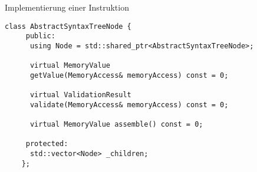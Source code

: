 
\begin{frame}[fragile]{Implementierung einer Instruktion}
  \pause
  \begin{lstlisting}[style=C++,emph={getValue, validate, assemble},emphstyle=\underline]
    class AbstractSyntaxTreeNode {
     public:
      using Node = std::shared_ptr<AbstractSyntaxTreeNode>;

      virtual MemoryValue
      getValue(MemoryAccess& memoryAccess) const = 0;

      virtual ValidationResult
      validate(MemoryAccess& memoryAccess) const = 0;

      virtual MemoryValue assemble() const = 0;

     protected:
      std::vector<Node> _children;
    };
  \end{lstlisting}
\end{frame}


